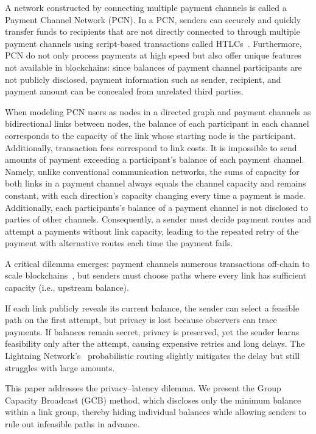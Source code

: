 \documentclass[conference]{IEEEtran}
\begin{document}
A network constructed by connecting multiple payment channels is called a Payment Channel Network (PCN).
In a PCN, senders can securely and quickly transfer funds to recipients that are not directly connected to through multiple payment channels using script-based transactions called HTLCs~\cite{poon_dryja_2016}.
Furthermore, PCN do not only process payments at high speed but also offer unique features not available in blockchains: since balances of payment channel participants are not publicly disclosed, payment information such as sender, recipient, and payment amount can be concealed from unrelated third parties.

When modeling PCN users as nodes in a directed graph and payment channels as bidirectional links between nodes, the balance of each participant in each channel corresponds to the capacity of the link whose starting node is the participant.
Additionally, transaction fees correspond to link costs.
It is impossible to send amounts of payment exceeding a participant's balance of each payment channel.
Namely, unlike conventional communication networks, the sums of capacity for both links in a payment channel always equals the channel capacity and remains constant, with each direction's capacity changing every time a payment is made.
Additionally, each participants's balance of a payment channel is not disclosed to parties of other channels.
Consequently, a sender must decide payment routes and attempt a payments without link capacity, leading to the repeated retry of the payment with alternative routes each time the payment fails.

A critical dilemma emerges: payment channels numerous transactions off-chain to scale blockchains~\cite{poon_dryja_2016}, but senders must choose paths where every link has sufficient capacity (i.e., upstream balance).

If each link publicly reveals its current balance, the sender can select a feasible path on the first attempt, but privacy is lost because observers can trace payments.
If balances remain secret, privacy is preserved, yet the sender learns feasibility only after the attempt, causing expensive retries and long delays.
The Lightning Network's~\cite{lnbolt} probabilistic routing slightly mitigates the delay but still struggles with large amounts.

This paper addresses the privacy–latency dilemma.
We present the Group Capacity Broadcast (GCB) method, which discloses only the minimum balance within a link group, thereby hiding individual balances while allowing senders to rule out infeasible paths in advance.
\end{document}
